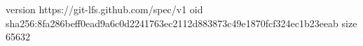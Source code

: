 version https://git-lfs.github.com/spec/v1
oid sha256:8fa286beff0ead9a6c0d2241763ec2112d883873c49e1870fcf324ec1b23eeab
size 65632
